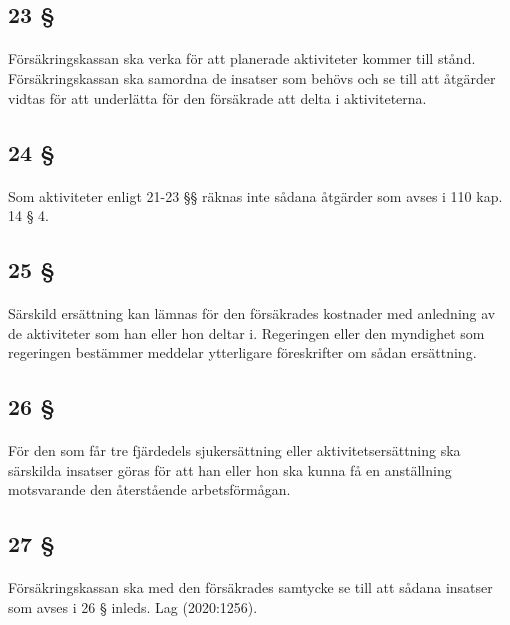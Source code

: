 \documentclass[a4paper,notitlepage,openany,10pt]{book}
\begin{document}
\subsection*{23 §}
\paragraph*{}
Försäkringskassan ska verka för att planerade aktiviteter kommer till stånd. Försäkringskassan ska samordna de insatser som behövs och se till att åtgärder vidtas för att underlätta för den försäkrade att delta i aktiviteterna.
\subsection*{24 §}
\paragraph*{}
Som aktiviteter enligt 21-23 §§ räknas inte sådana åtgärder som avses i 110 kap. 14 § 4.
\subsection*{25 §}
\paragraph*{}
Särskild ersättning kan lämnas för den försäkrades kostnader med anledning av de aktiviteter som han eller hon deltar i. Regeringen eller den myndighet som regeringen bestämmer meddelar ytterligare föreskrifter om sådan ersättning.
\subsection*{26 §}
\paragraph*{}
För den som får tre fjärdedels sjukersättning eller aktivitetsersättning ska särskilda insatser göras för att han eller hon ska kunna få en anställning motsvarande den återstående arbetsförmågan.
\subsection*{27 §}
\paragraph*{}
Försäkringskassan ska med den försäkrades samtycke se till att sådana insatser som avses i 26 § inleds.
Lag (2020:1256).
\end{document}
